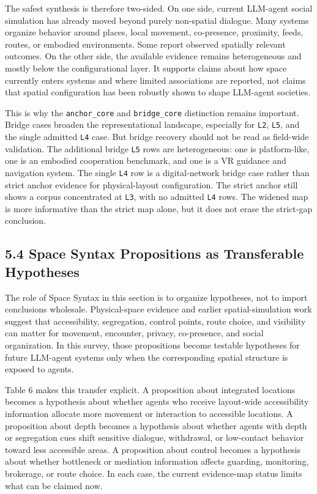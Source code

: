 \documentclass[
  twocolumn]{article}
\begin{document}
The safest synthesis is therefore two-sided. On one side, current
LLM-agent social simulation has already moved beyond purely non-spatial
dialogue. Many systems organize behavior around places, local movement,
co-presence, proximity, feeds, routes, or embodied environments. Some
report observed spatially relevant outcomes. On the other side, the
available evidence remains heterogeneous and mostly below the
configurational layer. It supports claims about how space currently
enters systems and where limited associations are reported, not claims
that spatial configuration has been robustly shown to shape LLM-agent
societies.

This is why the \texttt{anchor\_core} and \texttt{bridge\_core}
distinction remains important. Bridge cases broaden the representational
landscape, especially for \texttt{L2}, \texttt{L5}, and the single
admitted \texttt{L4} case. But bridge recovery should not be read as
field-wide validation. The additional bridge \texttt{L5} rows are
heterogeneous: one is platform-like, one is an embodied cooperation
benchmark, and one is a VR guidance and navigation system. The single
\texttt{L4} row is a digital-network bridge case rather than strict
anchor evidence for physical-layout configuration. The strict anchor
still shows a corpus concentrated at \texttt{L3}, with no admitted
\texttt{L4} rows. The widened map is more informative than the strict
map alone, but it does not erase the strict-gap conclusion.

\subsection{5.4 Space Syntax Propositions as Transferable
Hypotheses}\label{space-syntax-propositions-as-transferable-hypotheses}

The role of Space Syntax in this section is to organize hypotheses, not
to import conclusions wholesale. Physical-space evidence and earlier
spatial-simulation work suggest that accessibility, segregation, control
points, route choice, and visibility can matter for movement, encounter,
privacy, co-presence, and social organization. In this survey, those
propositions become testable hypotheses for future LLM-agent systems
only when the corresponding spatial structure is exposed to agents.

Table 6 makes this transfer explicit. A proposition about integrated
locations becomes a hypothesis about whether agents who receive
layout-wide accessibility information allocate more movement or
interaction to accessible locations. A proposition about depth becomes a
hypothesis about whether agents with depth or segregation cues shift
sensitive dialogue, withdrawal, or low-contact behavior toward less
accessible areas. A proposition about control becomes a hypothesis about
whether bottleneck or mediation information affects guarding,
monitoring, brokerage, or route choice. In each case, the current
evidence-map status limits what can be claimed now.
\end{document}
